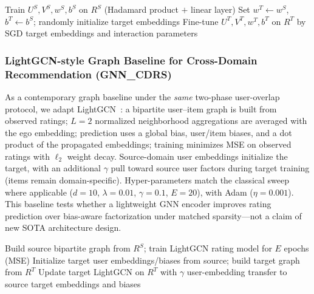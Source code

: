 \documentclass[pdflatex,sn-mathphys-num]{sn-jnl}%
\theoremstyle{thmstyleone}%
\theoremstyle{thmstyletwo}%
\theoremstyle{thmstylethree}%
\begin{document}
\begin{algorithm}[htbp]
\caption{Training procedure of DMF\_CDRS.}
\label{alg:dmf}
\begin{algorithmic}[1]
\State Train $U^S,V^S,w^S,b^S$ on $R^S$ (Hadamard product $+$ linear layer)
\State Set $w^T \leftarrow w^S$, $b^T \leftarrow b^S$; randomly initialize target embeddings
\State Fine-tune $U^T,V^T,w^T,b^T$ on $R^T$ by SGD
\EndFor
\State \Return target embeddings and interaction parameters
\end{algorithmic}
\end{algorithm}

\subsubsection{LightGCN-style Graph Baseline for Cross-Domain Recommendation (GNN\_CDRS)}
As a contemporary graph baseline under the \emph{same} two-phase user-overlap protocol, we adapt LightGCN~\cite{he2020lightgcn}: a bipartite user--item graph is built from observed ratings; $L{=}2$ normalized neighborhood aggregations are averaged with the ego embedding; prediction uses a global bias, user/item biases, and a dot product of the propagated embeddings; training minimizes MSE on observed ratings with $\ell_2$ weight decay. Source-domain user embeddings initialize the target, with an additional $\gamma$ pull toward source user factors during target training (items remain domain-specific). Hyper-parameters match the classical sweep where applicable ($d{=}10$, $\lambda{=}0.01$, $\gamma{=}0.1$, $E{=}20$), with Adam ($\eta{=}0.001$). This baseline tests whether a lightweight GNN encoder improves rating prediction over bias-aware factorization under matched sparsity---not a claim of new SOTA architecture design.

\begin{algorithm}[htbp]
\caption{Training procedure of GNN\_CDRS.}
\label{alg:gnn}
\begin{algorithmic}[1]
\State Build source bipartite graph from $R^S$; train LightGCN rating model for $E$ epochs (MSE)
\State Initialize target user embeddings/biases from source; build target graph from $R^T$
\State Update target LightGCN on $R^T$ with $\gamma$ user-embedding transfer to source
\EndFor
\State \Return target embeddings and biases
\end{algorithmic}
\end{algorithm}
\end{document}
